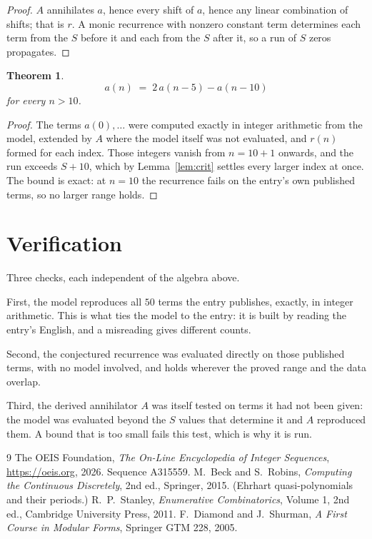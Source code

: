 \documentclass[11pt,a4paper]{article}
\theoremstyle{plain}
\newtheorem{theorem}{Theorem}
\theoremstyle{definition}
\begin{document}
\begin{proof}
$A$ annihilates $a$, hence every shift of $a$, hence any linear combination of shifts; that is
$r$. A monic recurrence with nonzero constant term determines each term from the $S$ before it
and each from the $S$ after it, so a run of $S$ zeros propagates.
\end{proof}

\begin{theorem}
\[
a(n)\;=\;2\,a(n-5) - a(n-10)
\]
for every $n>10$.
\end{theorem}

\begin{proof}
The terms $a(0),\dots$ were computed exactly in integer arithmetic from the model, extended by
$A$ where the model itself was not evaluated, and $r(n)$ formed for each index. Those integers
vanish from $n=10+1$ onwards, and the run exceeds $S+10$, which by
Lemma~\ref{lem:crit} settles every larger index at once. The bound is exact: at $n=10$ the recurrence fails on the entry's own published terms, so no larger range holds.
\end{proof}

\section{Verification}

Three checks, each independent of the algebra above.

First, the model reproduces all $50$ terms the entry publishes, exactly, in integer
arithmetic. This is what ties the model to the entry: it is built by reading the entry's
English, and a misreading gives different counts.

Second, the conjectured recurrence was evaluated directly on those published terms, with no
model involved, and holds wherever the proved range and the data overlap.

Third, the derived annihilator $A$ was itself tested on terms it had not been given: the model
was evaluated beyond the $S$ values that determine it and $A$ reproduced them. A bound that is
too small fails this test, which is why it is run.

\begin{thebibliography}{9}
 The OEIS Foundation, \emph{The On-Line Encyclopedia of Integer
Sequences}, \url{https://oeis.org}, 2026. Sequence A315559.
 M.~Beck and S.~Robins, \emph{Computing the Continuous Discretely},
2nd ed., Springer, 2015. (Ehrhart quasi-polynomials and their periods.)
 R.~P.~Stanley, \emph{Enumerative Combinatorics}, Volume 1, 2nd ed.,
Cambridge University Press, 2011.
 F.~Diamond and J.~Shurman, \emph{A First Course in Modular Forms},
Springer GTM 228, 2005.
\end{thebibliography}
\end{document}
